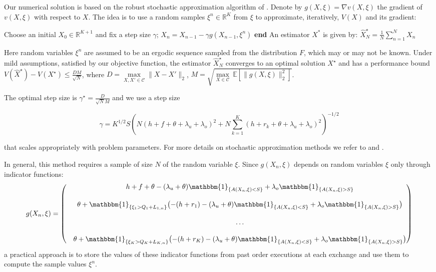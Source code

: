 \documentclass[opre,nonblindrev]{informs3}
\newcommand{\indicator}[1]{\mathbbm{1}_{\left\{ {#1} \right\} }}
\begin{document}
Our numerical solution is based on the robust stochastic approximation algorithm of \cite{Nemirovski2009}. Denote by $g(X,\xi)=\nabla v(X,\xi)$ the gradient of $v(X,\xi)$  with respect to $X$. 
 The idea is to use a random samples  $\xi^n\in\mathbb{R}^{K}$ from $\xi$ to approximate, iteratively, $V(X)$ and its gradient:
\vskip 6pt
\begin{algorithmic}[1]
\STATE Choose an initial $X_0\in\mathbb{R}^{K+1}$ and fix a step size $\gamma$;
\STATE   $X_{n}=X_{n-1}-\gamma g(X_{n-1},\xi^n)$
\ENDFOR
\STATE \textbf{end}
\STATE An estimator $X^*$ is given by: $\hat X_N^\star=\frac{1}{N}\sum_{n=1}^NX_n$
\end{algorithmic}
\vskip 6pt

\noindent Here random variables $\xi^n$ are assumed to be an ergodic sequence sampled from the distribution $F$, which may or may not be known. Under  mild assumptions, satisfied by our objective function, the estimator $\hat X_N^\star$ converges to an optimal solution $X^\star$ and has a performance bound \newline $V(\hat X^\star)-V(X^\star)\leq\frac{DM}{\sqrt{N}}$, where $D=\underset{X,X'\in\mathcal{C}}{\max}\|X-X'\|_2$, $M=\sqrt{\underset{X\in\mathcal{C}}{\max}~\mathbb{E}\left[\|g(X,\xi)\|^2_2\right]}$.

\noindent The optimal step size is $\gamma^\star=\frac{D}{\sqrt{N}M}$ and we use a step size

$$\gamma=K^{1/2}S\left(N(h+f+\theta+\lambda_u+\lambda_o)^2 +N\sum\limits_{k=1}^K(h+r_k+\theta+\lambda_u+\lambda_o)^2\right)^{-1/2}$$

\noindent that scales appropriately with problem parameters. For  more details on stochastic approximation methods we refer to \cite{Kushner2003} and \cite{Nemirovski2009}.

In general, this method requires a sample of size $N$ of the random variable $\xi$. Since
$g(X_n,\xi)$ depends on random variables $\xi$ only through indicator functions:
\small
$$
g(X_n,\xi)=
\left(
\begin{matrix}
& h + f +\theta -(\lambda_u+\theta)\indicator{A(X_n,\xi)<S} + \lambda_o\indicator{A(X_n,\xi)>S}\\
\\
&\theta + \indicator{\xi_1>Q_1+L_{1,n}}\bigl(-(h+r_1) -(\lambda_u+\theta)\indicator{A(X_n,\xi)<S} + \lambda_o\indicator{A(X_n,\xi)>S}\bigr) \\
&\\
&\dots\\
&\\
&\theta + \indicator{\xi_K>Q_K+L_{K,n}}\bigl(-(h+r_K) -(\lambda_u+\theta)\indicator{A(X_n,\xi)<S} + \lambda_o\indicator{A(X_n,\xi)>S}\bigr) \\
\end{matrix}
\right)
$$
\normalsize
\vskip 6pt
\noindent a practical approach is to store the values of these indicator functions from past order executions at each exchange and use them to compute the sample values  $\xi^n$.
\end{document}
